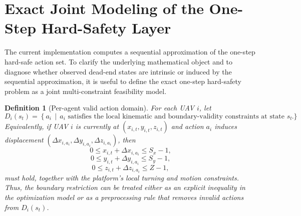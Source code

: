 \documentclass[11pt]{article}
\newtheorem{definition}{Definition}
\begin{document}
\section{Exact Joint Modeling of the One-Step Hard-Safety Layer}

The current implementation computes a sequential approximation of the one-step hard-safe action set. To clarify the underlying mathematical object and to diagnose whether observed dead-end states are intrinsic or induced by the sequential approximation, it is useful to define the exact one-step hard-safety problem as a joint multi-constraint feasibility model.

\begin{definition}[Per-agent valid action domain]
For each UAV $i$, let
\begin{equation}
D_i(s_t)
=
\left\{
a_i \,\middle|\,
\text{$a_i$ satisfies the local kinematic and boundary-validity constraints at state $s_t$}
\right\}.
\end{equation}
Equivalently, if UAV $i$ is currently at $(x_{i,t},y_{i,t},z_{i,t})$ and action $a_i$ induces displacement $(\Delta x_{i,a_i},\Delta y_{i,a_i},\Delta z_{i,a_i})$, then
\begin{equation}
0 \le x_{i,t} + \Delta x_{i,a_i} \le S_x-1,
\end{equation}
\begin{equation}
0 \le y_{i,t} + \Delta y_{i,a_i} \le S_y-1,
\end{equation}
\begin{equation}
0 \le z_{i,t} + \Delta z_{i,a_i} \le Z-1,
\end{equation}
must hold, together with the platform's local turning and motion constraints. Thus, the boundary restriction can be treated either as an explicit inequality in the optimization model or as a preprocessing rule that removes invalid actions from $D_i(s_t)$.
\end{definition}
\end{document}
